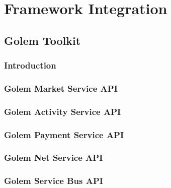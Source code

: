 
\section{Framework Integration}

\subsection{Golem Toolkit}

\subsubsection{Introduction}

\subsubsection{Golem Market Service API}




\subsubsection{Golem Activity Service API}




\subsubsection{Golem Payment Service API}




\subsubsection{Golem Net Service API}

\subsubsection{Golem Service Bus API}

